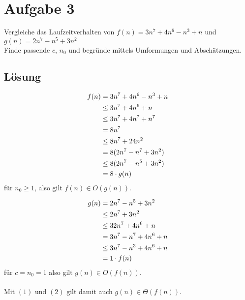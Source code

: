 \documentclass[11pt]{article} %
\begin{document}
\section{Aufgabe 3}

Vergleiche das Laufzeitverhalten von $f(n) = 3n^7 + 4n^6 - n^3 + n$ und $g(n) = 2n^7 - n^5 + 3n^2$\\
Finde passende $c$, $n_0$ und begründe mittels Umformungen und Abschätzungen.


\subsection{Lösung}

\begin{align}
  f(n)
  &= 3n^7 + 4n^6 - n^3 + n
  \notag\\ &\leq 3n^7 + 4n^6 + n
  \notag\\ &\leq 3n^7 + 4n^7 + n^7
  \notag\\ &= 8n^7
  \notag\\ &\leq 8n^7 + 24n^2
  \notag\\ &= 8(2n^7 - n^7 + 3n^2)
  \notag\\ &\leq 8(2n^7 - n^5 + 3n^2)
  \notag\\ &= 8 \cdot g(n)
\end{align}
für $n_0 \geq 1$, also gilt $f(n) \in O( g(n) )$.


\begin{align}
  g(n)
  &= 2n^7 - n^5 + 3n^2
  \notag\\ &\leq 2n^7 + 3n^2
  \notag\\ &\leq 32n^7 + 4n^6 + n
  \notag\\ &= 3n^7 - n^7 + 4n^6 + n
  \notag\\ &\leq 3n^7 - n^3 + 4n^6 + n
  \notag\\ &= 1 \cdot f(n)
\end{align}
für $c = n_0 = 1$ also gilt $g(n) \in O( f(n) )$.\\
\ \\
Mit $(1)$ und $(2)$ gilt damit auch $g(n) \in \Theta( f(n) )$.
\end{document}
